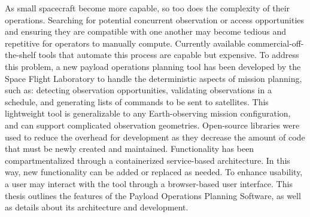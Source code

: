 \doublespacing 

As small spacecraft become more capable, so too does the complexity of their
operations. Searching for potential concurrent observation or access
opportunities and ensuring they are compatible with one another may become
tedious and repetitive for operators to manually compute. Currently available
commercial-off-the-shelf tools that automate this process are capable but
expensive. To address this problem, a new payload operations planning tool has
been developed by the Space Flight Laboratory to handle the deterministic
aspects of mission planning, such as: detecting observation opportunities,
validating observations in a schedule, and generating lists of commands to be
sent to satellites. This lightweight tool is generalizable to any
Earth-observing mission configuration, and can support complicated observation
geometries. Open-source libraries were used to reduce the overhead for
development as they decrease the amount of code that must be newly created and
maintained. Functionality has been compartmentalized through a containerized
service-based architecture. In this way, new functionality can be added or
replaced as needed. To enhance usability, a user may interact with the tool
through a browser-based user interface. This thesis outlines the features of the
Payload Operations Planning Software, as well as details about its architecture
and development.

\doublespacing
